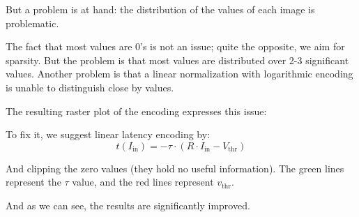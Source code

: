 But a problem is at hand: the distribution of the values of each image is problematic.

The fact that most values are 0's is not an issue; quite the opposite, we aim for sparsity. But the problem is that most values are distributed over 2-3 significant values. Another problem is that a linear normalization with logarithmic encoding is unable to distinguish close by values.

The resulting raster plot of the encoding expresses this issue:

\begin{figure}[h]
    \centering
\end{figure}

To fix it, we suggest linear latency encoding by:
\begin{equation}
t(I_{\text{in}}) = -\tau \cdot \left(R \cdot I_{\text{in}} - V_{\text{thr}}\right)
\end{equation}

And clipping the zero values (they hold no useful information). The green lines represent the $\tau$ value, and the red lines represent $v_{\text{thr}}$.

And as we can see, the results are significantly improved.
